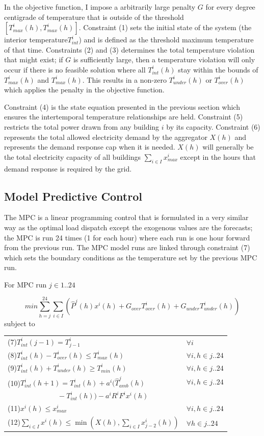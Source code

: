 \documentclass[journal]{IEEEtran}
\begin{document}
In the objective function, I impose a arbitrarily large penalty \(G\) for every degree centigrade of temperature that is outside of the threshold \([T_{max}^i(h), T_{max}^i(h)]\). Constraint (1) sets the initial state of the system (the interior temperature\(T_{int}^{i}\)) and is defined as the threshold maximum temperature of that time. Constraints (2) and (3) determines the total temperature violation that might exist; if \(G\) is sufficiently large, then a temperature violation will only occur if there is no feasible solution where all \( T_{int}^{i}(h)\) stay within the bounds of \(T_{max}^i(h)\) and \(T_{max}^i(h)\). This results in a non-zero \(T_{under}^{i}(h)\) or \(T_{over}^{i}(h)\) which applies the penalty in the objective function.

Constraint (4) is the state equation presented in the previous section which ensures the intertemporal temperature relationships are held. Constraint (5) restricts the total power drawn from any building \(i\) by its capacity. Constraint (6) represents the total allowed electricity demand by the aggregator \(X(h)\) and represents the demand response cap when it is needed. \(X(h)\) will generally be the total electricity capacity of all buildings \(\sum_{i \in I} x_{max}^i\) except in the hours that demand response is required by the grid.

\subsection{Model Predictive Control}
The MPC is a linear programming control that is formulated in a very similar way as the optimal load dispatch except the exogenous values are the forecasts; the MPC is run 24 times (1 for each hour) where each run is one hour forward from the previous run. The MPC model runs are linked through constraint (7) which sets the boundary conditions as the temperature set by the previous MPC run.

For MPC run \(j \in 1..24\)

\[ min \sum_{h=j}^{24}\sum_{i\in I} (\hat{P}^j(h) x^i(h)+G_{over}T_{over}^i(h)+G_{under}T_{under}^i(h))\]
subject to

\begin{tabular}{ l l} 
(7)$T_{int}^{i}(j-1)=T_{j-1}^i$ & $\forall{} i$ \\
(8)$T_{int}^{i}(h)-T_{over}^{i}(h) \leq T_{max}^i(h)$ & $\forall{} i, h \in j..24$\\
(9)$T_{int}^{i}(h)+T_{under}^{i}(h) \geq T_{min}^i(h)$ & $\forall{} i, h \in j..24$\\
(10)$T_{int}^{i}(h+1)=T_{int}^{i}(h)+a^i(\hat{T}_{amb}^{j}(h)$& $\forall{} i, h \in j..24$\\
$\quad \qquad \qquad \qquad -T_{int}^{i}(h))-a^iR^iF^ix^i(h)$&\\
(11)$x^i(h) \leq x_{max}^i$& $\forall{} i, h \in j..24$\\
(12)$\sum_{i\in I}x^i(h) \leq \min(X(h),\sum_{i\in I}x^i_{j-2}(h)) $& $\forall{} h \in j..24$\\
\end{tabular}
\end{document}
